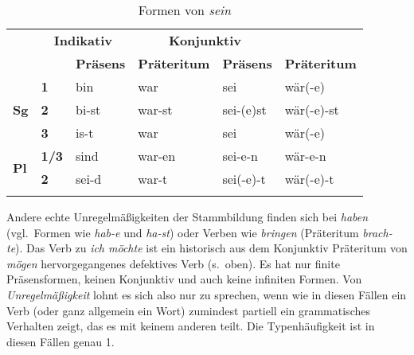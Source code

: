 \begin{table}[!htbp]
  \centering
  \begin{tabular}{llllll}
    \lsptoprule
    \multicolumn{2}{c}{} & \multicolumn{2}{c}{\textbf{Indikativ}} & \multicolumn{2}{c}{\textbf{Konjunktiv}} \\
    \multicolumn{2}{c}{} & \textbf{Präsens} & \textbf{Präteritum} & \textbf{Präsens} & \textbf{Präteritum} \\
    \midrule
    \multirow{3}{*}{\textbf{Sg}} & \textbf{1} & bin & war & sei & wär(-e) \\
    & \textbf{2} & bi-st & war-st & sei-(e)st & wär(-e)-st \\
    & \textbf{3} & is-t & war & sei & wär(-e) \\
    \midrule
    \multirow{2}{*}{\textbf{Pl}} & \textbf{1/3} & sind & war-en & sei-e-n & wär-e-n \\
     & \textbf{2} & sei-d & war-t & sei(-e)-t & wär(-e)-t \\
    \lspbottomrule
  \end{tabular}
  \caption{Formen von \textit{sein}}
  \label{tab:kleineverbklassen124}
\end{table}

Andere echte Unregelmäßigkeiten der Stammbildung finden sich bei \textit{haben} (vgl.\ Formen wie \textit{hab-e} und \textit{ha-st}) oder Verben wie \textit{bringen} (Präteritum \textit{brach-te}).
\label{abs:kleineverbklassen125}Das Verb zu \textit{ich möchte} ist ein historisch aus dem Konjunktiv Präteritum von \textit{mögen} hervorgegangenes defektives Verb (s.\ oben).
Es hat nur finite Präsensformen, keinen Konjunktiv und auch keine infiniten Formen.
Von \textit{Unregelmäßigkeit} lohnt es sich also nur zu sprechen, wenn wie in diesen Fällen ein Verb (oder ganz allgemein ein Wort) zumindest partiell ein grammatisches Verhalten zeigt, das es mit keinem anderen teilt.
Die Typenhäufigkeit ist in diesen Fällen genau 1.



